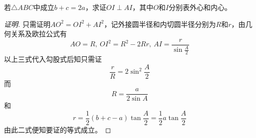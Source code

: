 \begin{exercise}
 若$\triangle ABC$中成立$b+c=2a$，求证$OI \perp AI$，其中$O$和$I$分别表外心和内心。
\end{exercise}

\begin{proof}[证明]
  只需证明$AO^2=OI^2+AI^2$，记外接圆半径和内切圆半径分别为$R$和$r$，由几何关系及欧拉公式有
  \[ AO=R, \  OI^2=R^2-2Rr, \  AI=\frac{r}{\sin{\frac{A}{2}}} \]
  以上三式代入勾股式后知只需证
  \[ \frac{r}{R}=2\sin^2{\frac{A}{2}} \]
  而
  \[ R=\frac{a}{2\sin{A}} \]
  和
  \[ r=\frac{1}{2}(b+c-a)\tan{\frac{A}{2}}=\frac{1}{2}a\tan{\frac{A}{2}} \]
  由此二式便知要证的等式成立。
\end{proof}

